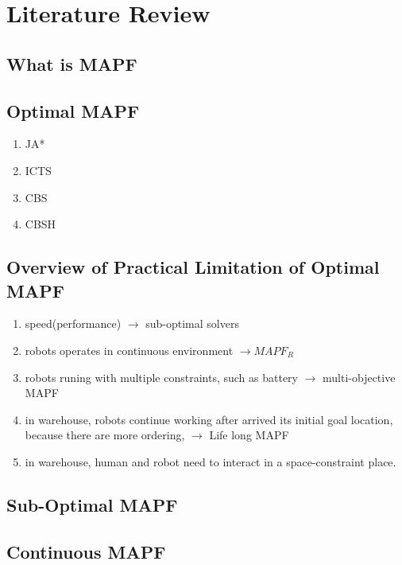 \chapter{Literature Review}
\section{What is MAPF}
\section{Optimal MAPF}
\begin{enumerate}
    \item JA*
    \item ICTS
    \item CBS
    \item CBSH
\end{enumerate}
\section{Overview of Practical Limitation of Optimal MAPF}
\begin{enumerate}
    \item speed(performance)  $\rightarrow$ sub-optimal solvers
    \item robots operates in continuous environment $\rightarrow MAPF_R$
    \item robots runing with multiple constraints, such as battery $\rightarrow$ multi-objective MAPF
    \item in warehouse, robots continue working after arrived its initial goal location, because there are more ordering, $\rightarrow$ Life long MAPF
    \item in warehouse, human and robot need to interact in a space-constraint place. 
\end{enumerate}
\section{Sub-Optimal MAPF}
\section{Continuous MAPF}